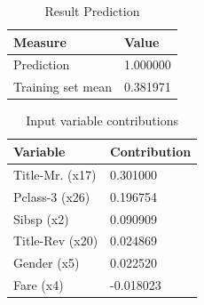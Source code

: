 \documentclass{article}
\begin{document}
\begin{table}[H]
	\centering
	\caption{Result Prediction}
	\label{tab:Result-Prediction}
	\begin{tabular}{|l|l|}
		\hline
		\textbf{Measure}    & \textbf{Value} \\ \hline
		Prediction       	& 1.000000 	  	 \\ \hline
		Training set mean   & 0.381971 	  	 \\ \hline
	\end{tabular}
\end{table}

\begin{table}[H]
	\centering
	\caption{Input variable contributions}
	\label{tab:Vars-Contribution}
	\begin{tabular}{|l|l|}
		\hline
		\textbf{Variable}   & \textbf{Contribution}	\\ \hline
		Title-Mr. (x17)	    & 0.301000 				\\ \hline
		Pclass-3 (x26)	    & 0.196754 				\\ \hline
		Sibsp (x2)	       	& 0.090909 				\\ \hline
		Title-Rev (x20)	    & 0.024869				\\ \hline
		Gender (x5)	       	& 0.022520 				\\ \hline
		Fare (x4)	       	& -0.018023 			\\ \hline
	\end{tabular}
\end{table}
\end{document}
